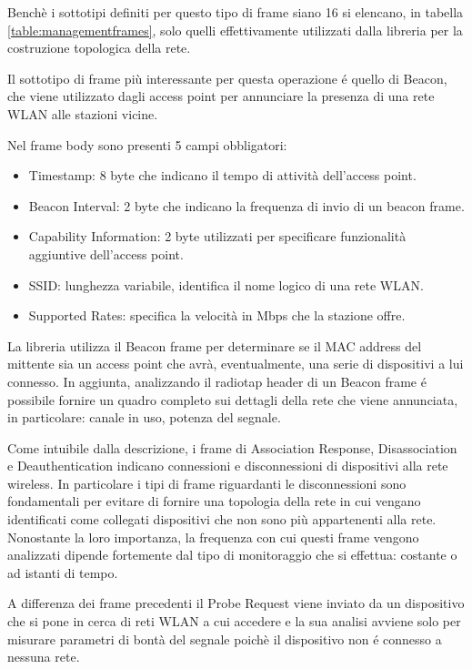Bench\`e i sottotipi definiti per questo tipo di frame siano 16 si elencano, in tabella \ref{table:managementframes}, solo quelli effettivamente utilizzati dalla libreria per la costruzione topologica della rete.

Il sottotipo di frame pi\`u interessante per questa operazione \'e quello di Beacon, che viene utilizzato dagli access point per annunciare la presenza di una rete WLAN alle stazioni vicine.

Nel frame body sono presenti 5 campi obbligatori:

\begin{itemize}
	\item Timestamp: 8 byte che indicano il tempo di attivit\`a dell'access point.
	\item Beacon Interval: 2 byte che indicano la frequenza di invio di un beacon frame.
	\item Capability Information: 2 byte utilizzati per specificare 
	funzionalit\`a aggiuntive dell'access point.
	\item	SSID: lunghezza variabile, identifica il nome logico di una rete WLAN.
	\item Supported Rates: specifica la velocit\`a in Mbps che la stazione offre.
\end{itemize}

La libreria utilizza il Beacon frame per determinare se il MAC address del mittente sia  un access point che avr\`a, eventualmente, una serie di dispositivi a lui connesso.
In aggiunta, analizzando il radiotap header di un Beacon frame \'e possibile fornire un quadro completo sui dettagli della rete che viene annunciata, in particolare: canale in uso, potenza del segnale.

Come intuibile dalla descrizione, i frame di Association Response, Disassociation e Deauthentication indicano connessioni e disconnessioni di dispositivi alla rete wireless.
In particolare i tipi di frame riguardanti le disconnessioni sono fondamentali per evitare di fornire una topologia della rete in cui vengano identificati come collegati dispositivi che non sono pi\`u appartenenti alla rete.
Nonostante la loro importanza, la frequenza con cui questi frame vengono analizzati dipende fortemente dal tipo di monitoraggio che si effettua: costante o ad istanti di tempo.

A differenza dei frame precedenti il Probe Request viene inviato da un dispositivo che si pone in cerca di reti WLAN a cui accedere e  la sua analisi avviene solo per misurare parametri di bont\`a del segnale poich\`e il dispositivo non \'e connesso a nessuna rete.

